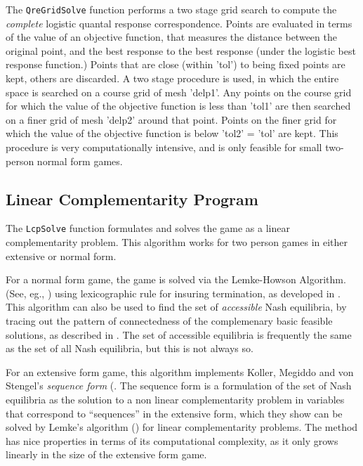 The \texttt{QreGridSolve} function performs a two stage grid search to
compute the {\em complete} logistic quantal response correspondence.
Points are evaluated in terms of the value of an objective function,
that measures the distance between the original point, and the best
response to the best response (under the logistic best response
function.)  Points that are close (within 'tol') to being fixed points
are kept, others are discarded.  A two stage procedure is used, in
which the entire space is searched on a course grid of mesh 'delp1'.
Any points on the course grid for which the value of the objective
function is less than 'tol1' are then searched on a finer grid of mesh
'delp2' around that point.  Points on the finer grid for which the
value of the objective function is below 'tol2' = 'tol' are kept.
This procedure is very computationally intensive, and is only feasible
for small two-person normal form games.

\subsection{Linear Complementarity Program}

The \texttt{LcpSolve} function formulates and solves the game as a linear
complementarity problem.  This algorithm works for two person
games in either extensive or normal form.  
 
For a normal form game, the game is solved via the Lemke-Howson
Algorithm.  (See, eg.,
\cite{LemHow:64}) using lexicographic rule for insuring
termination, as developed in \cite{Eav:71}.  This algorithm can also
be used to find the set of {\em accessible} Nash equilibria, by
tracing out the pattern of connectedness of the complemenary basic
feasible solutions, as described in \cite{Sha:74}.  The set of
accessible equilibria is frequently the same as the set of all Nash
equilibria, but this is not always so.

For an extensive form game, this algorithm implements Koller, Megiddo
and von Stengel's {\em sequence form} (\cite{KolMegSte:94}. The
sequence form is a formulation of the set of Nash equilibria as the
solution to a non linear complementarity problem in variables that
correspond to ``sequences'' in the extensive form, which they show can
be solved by Lemke's algorithm (\cite{Lem:65}) for linear
complementarity problems.  The method has nice properties in terms of
its computational complexity, as it only grows linearly in the size of
the extensive form game.

